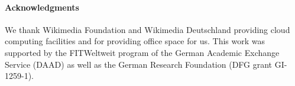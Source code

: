 \documentclass[a4paper]{article}
\begin{document}
\paragraph*{Acknowledgments} We thank Wikimedia Foundation and Wikimedia Deutschland providing cloud computing facilities and for providing office space for us.
This work was supported by the FITWeltweit program of the German Academic Exchange Service (DAAD) as well as the German Research Foundation (DFG grant GI-1259-1).
\printbibliography%
\end{document}

